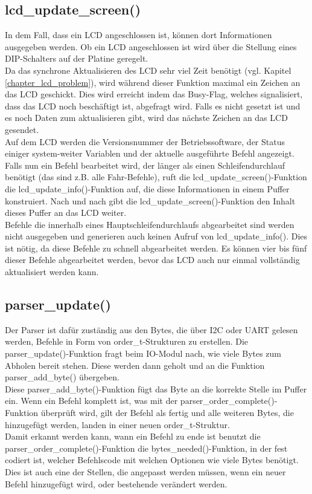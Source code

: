 \subsection{lcd\_update\_screen()}
In dem Fall, dass ein LCD angeschlossen ist, können dort Informationen ausgegeben werden. Ob ein LCD
angeschlossen ist wird über die Stellung eines DIP-Schalters auf der Platine geregelt.\\
Da das synchrone Aktualisieren des LCD sehr viel Zeit benötigt (vgl. Kapitel \ref{chapter_lcd_problem}), wird
während dieser Funktion maximal ein Zeichen an das LCD geschickt. Dies wird erreicht indem das Busy-Flag,
welches signalisiert, dass das LCD noch beschäftigt ist, abgefragt wird. Falls es nicht gesetzt ist und
es noch Daten zum aktualisieren gibt, wird das nächste Zeichen an das LCD gesendet.\\
Auf dem LCD werden die Versionsnummer der Betriebssoftware, der Status einiger system-weiter Variablen und
der aktuelle ausgeführte Befehl angezeigt. Falls nun ein Befehl bearbeitet wird, der länger als einen
Schleifendurchlauf benötigt (das sind z.B. alle Fahr-Befehle), ruft die lcd\_\-update\_\-screen()-Funktion
die lcd\_\-update\_\-info()-Funktion auf, die diese Informationen in einem Puffer konstruiert. Nach und nach
gibt die lcd\_\-update\_\-screen()-Funktion den Inhalt dieses Puffer an das LCD weiter.\\
Befehle die innerhalb eines Hauptschleifendurchlaufs abgearbeitet sind werden nicht ausgegeben und
generieren auch keinen Aufruf von lcd\_\-update\_\-info(). Dies ist nötig, da diese Befehle zu schnell abgearbeitet
werden. Es können vier bis fünf dieser Befehle abgearbeitet werden, bevor das LCD auch nur einmal vollständig
aktualisiert werden kann.
\subsection{parser\_update()}
Der Parser ist dafür zuständig aus den Bytes, die über I2C oder UART gelesen werden, Befehle in Form von
order\_t-Strukturen zu erstellen. Die parser\_\-update()-Funktion fragt beim IO-Modul nach, wie viele Bytes
zum Abholen bereit stehen. Diese werden dann geholt und an die Funktion parser\_\-add\_\-byte() übergeben.\\
Diese parser\_\-add\_\-byte()-Funktion fügt das Byte an die korrekte Stelle im Puffer ein. Wenn ein Befehl
komplett ist, was mit der parser\_\-order\_\-complete()-Funktion überprüft wird, gilt der Befehl als fertig und
alle weiteren Bytes, die hinzugefügt werden, landen in einer neuen order\_t-Struktur.\\
Damit erkannt werden kann, wann ein Befehl zu ende ist benutzt die parser\_\-order\_\-complete()-Funktion
die bytes\_\-needed()-Funktion, in der fest codiert ist, welcher Befehlscode mit welchen Optionen wie viele
Bytes benötigt. Dies ist auch eine der Stellen, die angepasst werden müssen, wenn ein neuer Befehl hinzugefügt
wird, oder bestehende verändert werden.
